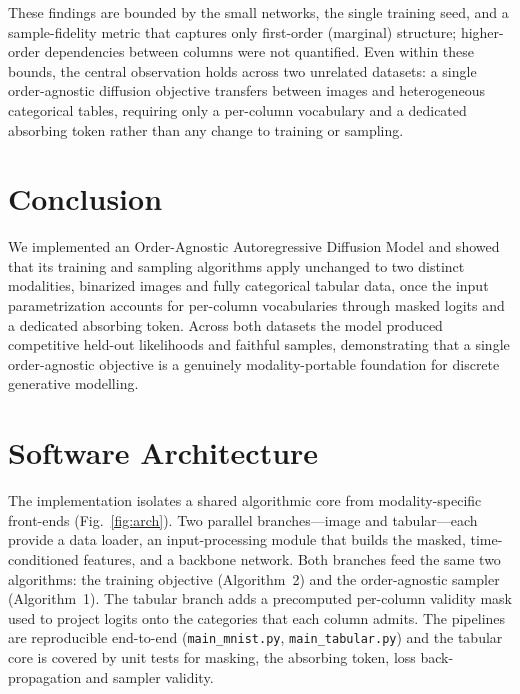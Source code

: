 \documentclass[conference]{IEEEtran}
\begin{document}
These findings are bounded by the small networks, the single training seed, and
a sample-fidelity metric that captures only first-order (marginal) structure;
higher-order dependencies between columns were not quantified. Even within these
bounds, the central observation holds across two unrelated datasets: a single
order-agnostic diffusion objective transfers between images and heterogeneous
categorical tables, requiring only a per-column vocabulary and a dedicated
absorbing token rather than any change to training or sampling.

\section{Conclusion}
We implemented an Order-Agnostic Autoregressive Diffusion Model and showed that
its training and sampling algorithms apply unchanged to two distinct
modalities, binarized images and fully categorical tabular data, once the input
parametrization accounts for per-column vocabularies through masked logits and a
dedicated absorbing token. Across both datasets the model produced competitive
held-out likelihoods and faithful samples, demonstrating that a single
order-agnostic objective is a genuinely modality-portable foundation for
discrete generative modelling.

\onecolumn
\appendices
\section{Software Architecture}
The implementation isolates a shared algorithmic core from modality-specific
front-ends (Fig.~\ref{fig:arch}). Two parallel branches---image and
tabular---each provide a data loader, an input-processing module that builds the
masked, time-conditioned features, and a backbone network. Both branches feed
the same two algorithms: the training objective (Algorithm~2) and the
order-agnostic sampler (Algorithm~1). The tabular branch adds a precomputed
per-column validity mask used to project logits onto the categories that each
column admits. The pipelines are reproducible end-to-end
(\texttt{main\_mnist.py}, \texttt{main\_tabular.py}) and the tabular core is
covered by unit tests for masking, the absorbing token, loss back-propagation
and sampler validity.
\end{document}
